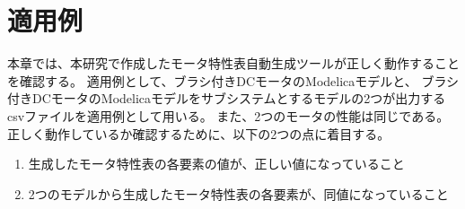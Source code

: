 \chapter{適用例}\label{cha:Indication}
本章では、本研究で作成したモータ特性表自動生成ツールが正しく動作することを確認する。
適用例として、ブラシ付きDCモータのModelicaモデルと、
ブラシ付きDCモータのModelicaモデルをサブシステムとするモデルの2つが出力するcsvファイルを適用例として用いる。
また、2つのモータの性能は同じである。
正しく動作しているか確認するために、以下の2つの点に着目する。


\begin{enumerate}
    \item 生成したモータ特性表の各要素の値が、正しい値になっていること
    \item 2つのモデルから生成したモータ特性表の各要素が、同値になっていること
\end{enumerate}


